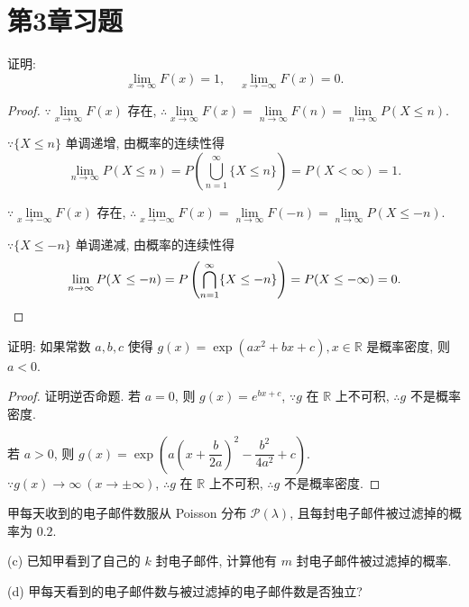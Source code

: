 \documentclass{ctexart}
\begin{document}
\section{第3章习题}
\addtocounter{exsection}{3}
\begin{exercise}%
    证明:
    \[\lim\limits_{x\to\infty}F(x)=1,\quad\lim\limits_{x\to-\infty}F(x)=0.\]
\end{exercise}
\begin{proof}
    $\because\lim\limits_{x\to\infty}F(x)$ 存在, $\therefore\lim\limits_{x\to\infty}F(x)=\lim\limits_{n\to\infty}F(n)=\lim\limits_{n\to\infty}P(X\leq n)$.

    $\because\{X\leq n\}$ 单调递增, 由概率的连续性得
    \[\lim\limits_{n\to\infty}P(X\leq n)=P\left(\bigcup\limits_{n=1}^\infty\{X\leq n\}\right)=P(X<\infty)=1.\]

    $\because\lim\limits_{x\to-\infty}F(x)$ 存在, $\therefore\lim\limits_{x\to-\infty}F(x)=\lim\limits_{n\to\infty}F(-n)=\lim\limits_{n\to\infty}P(X\leq-n)$.

    $\because\{X\leq-n\}$ 单调递减, 由概率的连续性得
    \[\lim\limits_{n\to\infty}P(X\leq-n)=P\left(\bigcap\limits_{n=1}^\infty\{X\leq-n\}\right)=P(X\leq-\infty)=0.\qedhere\]
\end{proof}
\begin{exercise}%
    证明: 如果常数 $a,b,c$ 使得 $g(x)=\exp(ax^2+bx+c),x\in\mathbb{R}$ 是概率密度, 则 $a<0$.
\end{exercise}
\begin{proof}
    证明逆否命题. 若 $a=0$, 则 $g(x)=e^{bx+c}$, $\because g$ 在 $\mathbb{R}$ 上不可积, $\therefore g$ 不是概率密度.
    
    若 $a>0$, 则 $g(x)=\exp\left(a\left(x+\dfrac{b}{2a}\right)^2-\dfrac{b^2}{4a^2}+c\right)$. $\because g(x)\to\infty\ (x\to\pm\infty)$, $\therefore g$ 在 $\mathbb{R}$ 上不可积, $\therefore g$ 不是概率密度.
\end{proof}
\addtocounter{exercise}{6}
\begin{exercise}%
    甲每天收到的电子邮件数服从 Poisson 分布 $\mathcal{P}(\lambda)$, 且每封电子邮件被过滤掉的概率为 $0.2$.

    (c) 已知甲看到了自己的 $k$ 封电子邮件, 计算他有 $m$ 封电子邮件被过滤掉的概率.

    (d) 甲每天看到的电子邮件数与被过滤掉的电子邮件数是否独立?
\end{exercise}
\end{document}
